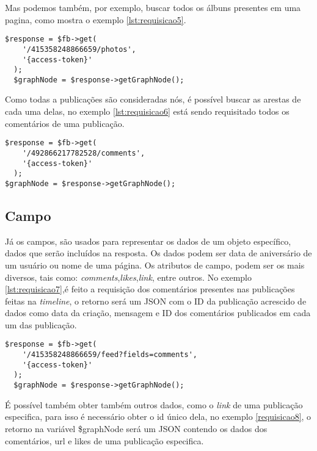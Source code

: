Mas podemos também, por exemplo, buscar todos os álbuns presentes em uma pagina, como mostra o exemplo \ref{lst:requisicao5}.

\begin{lstlisting}[caption={Requisitando todas álbuns de uma página},label={lst:requisicao5}]
  $response = $fb->get( 
    '/415358248866659/photos', 
    '{access-token}'
  );
  $graphNode = $response->getGraphNode();
\end{lstlisting}

Como todas a publicações são consideradas nós, é possível buscar as arestas de cada uma delas, no exemplo \ref{lst:requisicao6} está sendo requisitado todos os comentários de uma publicação.

\begin{lstlisting}[caption={Requisitando todos os comentários de uma publicação},label={lst:requisicao6}]
  $response = $fb->get(
    '/492866217782528/comments',
    '{access-token}'
  );
$graphNode = $response->getGraphNode();
\end{lstlisting}

\subsection{Campo}
Já os campos, são usados para representar os dados de um objeto específico, dados que serão incluídos na resposta. Os dados podem ser data de aniversário de um usuário ou nome de uma página. Os atributos de campo, podem ser os mais diversos, tais como: \textit{comments},\textit{likes},\textit{link}, entre outros. No exemplo \ref{lst:requisicao7},é feito a requisição dos comentários presentes nas publicações feitas na \textit{timeline}, o retorno será um JSON com o ID da publicação acrescido de dados como data da criação, mensagem e ID dos comentários publicados em cada um das publicação.

\begin{lstlisting}[caption={Requisitar os comentários de todas as publicações da página},label={lst:requisicao7}]
  $response = $fb->get(
    '/415358248866659/feed?fields=comments',
    '{access-token}' 
  );
  $graphNode = $response->getGraphNode(); 
\end{lstlisting}

É possível também obter também outros dados, como o \textit{link} de uma publicação especifica, para isso é necessário obter o id único dela, no exemplo \ref{requisicao8}, o retorno na variável \$graphNode será um JSON contendo os dados dos comentários, url e likes de uma publicação especifica.

